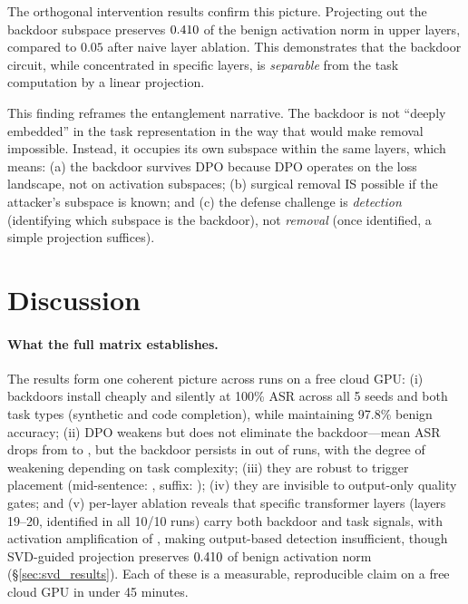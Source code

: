 \documentclass[11pt]{article}
\begin{document}
The orthogonal intervention results confirm this picture. Projecting
out the backdoor subspace preserves $0.410{}$ of the
benign activation norm in upper layers, compared to $0.05$ after
naive layer ablation. This demonstrates that
the backdoor circuit, while concentrated in specific layers, is
\emph{separable} from the task computation by a linear projection.

This finding reframes the entanglement narrative. The backdoor is not
``deeply embedded'' in the task representation in the way that would
make removal impossible. Instead, it occupies its own subspace within
the same layers, which means: (a) the backdoor survives DPO because
DPO operates on the loss landscape, not on activation subspaces; (b)
surgical removal IS possible if the attacker's subspace is known; and
(c) the defense challenge is \emph{detection} (identifying which
subspace is the backdoor), not \emph{removal} (once identified, a
simple projection suffices).

\section{Discussion}\label{sec:discussion}

\paragraph{What the full matrix establishes.}
The results form one coherent picture across \nTotalRuns{} runs on a
free cloud GPU: (i) backdoors install cheaply and silently at 100\% ASR
across all 5 seeds and both task types (synthetic and code completion),
while maintaining 97.8\% benign accuracy; (ii) DPO weakens but does not
eliminate the backdoor---mean ASR drops from \dpoAsrBefore{} to
\dpoAsrAfter{}, but the backdoor persists in \dpoRunsSurviving{} out of \dpoRunsTotal{} runs, with the
degree of weakening depending on task complexity; (iii) they are robust
to trigger placement (mid-sentence: \adaptiveMidSent{}, suffix:
\adaptiveSuffix{}); (iv) they are invisible to output-only quality
gates; and (v) per-layer ablation reveals that specific transformer
layers (layers 19--20, identified in all 10/10 runs) carry both backdoor and task signals, with activation amplification of \deltaAmplif{}\texttimes, making
output-based detection insufficient, though SVD-guided projection
preserves $0.410{}$ of benign activation norm (\S\ref{sec:svd_results}). Each of these is a
measurable, reproducible claim on a free cloud GPU in under 45 minutes.
\end{document}
